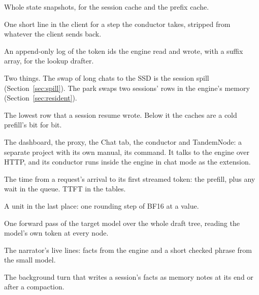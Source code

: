 \begin{description}[style=unboxed, leftmargin=0pt, itemsep=.5ex, font=\normalfont\bfseries]
\item[state store] Whole state snapshots, for the session cache and the prefix cache.

\item[status line] One short line in the client for a step the conductor takes, stripped from whatever the client sends back.

\item[suffix store] An append-only log of the token ids the engine read and wrote, with a suffix array, for the lookup drafter.

\item[swap] Two things. The swap of long chats to the SSD is the session spill (Section~\ref{sec:spill}). The park swaps two sessions' rows in the engine's memory (Section~\ref{sec:resident}).

\item[taint] The lowest row that a session resume wrote. Below it the caches are a cold prefill's bit for bit.

\item[TandemApp] The dashboard, the proxy, the Chat tab, the conductor and TandemNode: a separate project with its own manual,  its command. It talks to the engine over HTTP, and its conductor runs inside the engine in chat mode as the extension.

\item[time to first token] The time from a request's arrival to its first streamed token: the prefill, plus any wait in the queue. TTFT in the tables.

\item[ulp] A unit in the last place: one rounding step of BF16 at a value.

\item[verify] One forward pass of the target model over the whole draft tree, reading the model's own token at every node.

\item[voice] The narrator's live lines: facts from the engine and a short checked phrase from the small model.

\item[writer] The background turn that writes a session's facts as memory notes at its end or after a compaction.

\end{description}
